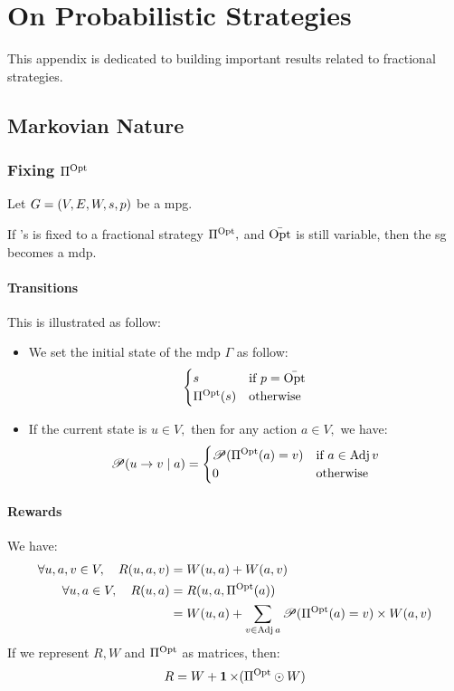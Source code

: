 \chapter{On Probabilistic Strategies}
\label{appendix:Probabilistic:Strategies}
This appendix is dedicated to building important results related to fractional strategies.


\section{Markovian Nature}
\subsection{Fixing $\Pi^{\operatorname{Opt}}$}
Let $G=(V,E,W,s,p)$ be a \acrshort{mpg}.

If \PlayerSet's is fixed to a fractional strategy $\Pi^{\operatorname{Opt}},$ and $\bar{\operatorname{Opt}}$ is still variable, then the \acrshort{sg} becomes a \acrshort{mdp}.
\subsubsection{Transitions}
This is illustrated as follow:
\begin{itemize}
	\item We set the initial state of the \acrshort{mdp} $\Gamma$ as follow:
	\begin{equation*}
		\begin{cases}
			s & \text{if} \ p=\bar{\operatorname{Opt}} \\
			\Pi^{\operatorname{Opt}}(s) & \text{otherwise}
		\end{cases}
	\end{equation*}
	
	\item If the current state is $u\in V,$ then for any action $a\in V,$ we have:
	\begin{equation*}
		\mathscr{P}(u\rightarrow v \mid a) =
		\begin{cases}
			\displaystyle \mathscr{P}(\Pi^{\operatorname{Opt}}(a)= v) & \text{if}\ a\in \operatorname{Adj} v \\
			0 & \text{otherwise}
		\end{cases} 
	\end{equation*}
\end{itemize}
\subsubsection{Rewards}
We have:
\begin{align*}
	\forall u,a,v\in V ,\quad R(u,a,v)&= W(u,a)+W(a,v) \\
	\forall u,a\in V,\quad R(u,a)&=R(u,a,\Pi^{\operatorname{Opt}}(a)) \\
	&= W(u,a)+\sum_{v\in \operatorname{Adj} a}\mathscr{P}(\Pi^{\operatorname{Opt}}(a)=v)\times W(a,v) 
\end{align*}
If we represent $R,W$ and $\Pi^{\operatorname{Opt}}$ as matrices, then:
\begin{equation}
	R=W+ \operatorname{\mathbf{1}} \times  (\Pi^{\operatorname{Opt}} \odot W)
\end{equation}

